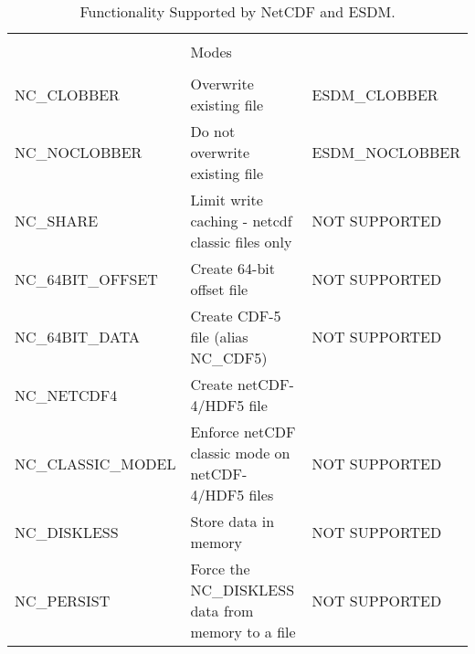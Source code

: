 \begin{table}[H]
\begin{tabular}{|l|l|l|}
& & \\
& \large{Modes} & \\
& & \\ \hline \hline

NC\_CLOBBER & Overwrite existing file &  ESDM\_CLOBBER       \\ \hline
NC\_NOCLOBBER & Do not overwrite existing file &  ESDM\_NOCLOBBER       \\ \hline
NC\_SHARE & Limit write caching - netcdf classic files only &  NOT SUPPORTED       \\ \hline
NC\_64BIT\_OFFSET & Create 64-bit offset file &    NOT SUPPORTED     \\ \hline
NC\_64BIT\_DATA  & Create CDF-5 file (alias NC\_CDF5) &   NOT SUPPORTED      \\ \hline
NC\_NETCDF4 & Create netCDF-4/HDF5 file &         \\ \hline
NC\_CLASSIC\_MODEL & Enforce netCDF classic mode on netCDF-4/HDF5 files &   NOT SUPPORTED      \\ \hline
NC\_DISKLESS & Store data in memory &    NOT SUPPORTED     \\ \hline
NC\_PERSIST & Force the NC\_DISKLESS data from memory to a file &  NOT SUPPORTED       \\ \hline
\hline


\end{tabular}
\caption{Functionality Supported by NetCDF and ESDM.}
\end{table}

